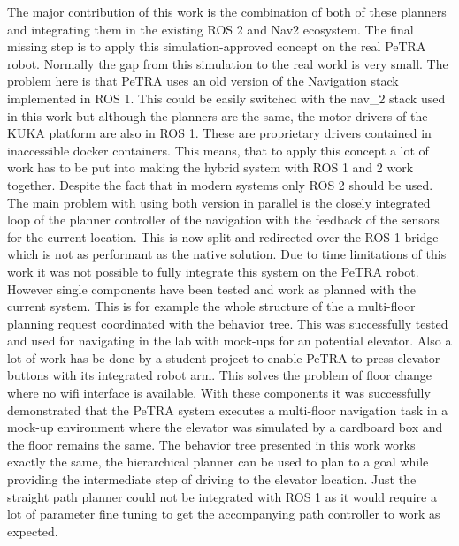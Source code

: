 The major contribution of this work is the combination of both of these planners and integrating them in the existing ROS 2 and Nav2 ecosystem. The final missing step is to apply this simulation-approved concept on the real PeTRA robot. Normally the gap from this simulation to the real world is very small. The problem here is that PeTRA uses an old version of the Navigation stack implemented in ROS 1. This could be easily switched with the \gls{nav_2} stack used in this work but although the planners are the same, the motor drivers of the KUKA platform are also in ROS 1. These are proprietary drivers contained in inaccessible docker containers. This means, that to apply this concept a lot of work has to be put into making the hybrid system with ROS 1 and 2 work together. Despite the fact that in modern systems only ROS 2 should be used. The main problem with using both version in parallel is the closely integrated loop of the planner controller of the navigation with the feedback of the sensors for the current location. This is now split and redirected over the ROS 1 bridge which is not as performant as the native solution. Due to time limitations of this work it was not possible to fully integrate this system on the PeTRA robot. However single components have been tested and work as planned with the current system. This is for example the whole structure of the a multi-floor planning request coordinated with the behavior tree. This was successfully tested and used for navigating in the lab with mock-ups for an potential elevator. Also a lot of work has be done by a student project to enable PeTRA to press elevator buttons with its integrated robot arm. This solves the problem of floor change where no wifi interface is available. With these components it was successfully demonstrated that the PeTRA system executes a multi-floor navigation task in a mock-up environment where the elevator was simulated by a cardboard box and the floor remains the same. The behavior tree presented in this work works exactly the same, the hierarchical planner can be used to plan to a goal while providing the intermediate step of driving to the elevator location. Just the straight path planner could not be integrated with ROS 1 as it would require a lot of parameter fine tuning to get the accompanying path controller to work as expected.

